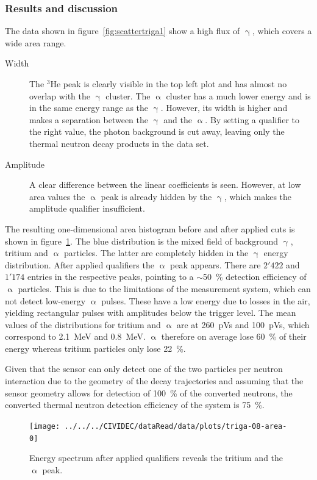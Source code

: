 \subsubsection{Results and discussion}
The data shown in figure~\ref{fig:scattertriga1} show a high flux of $\upgamma$, which covers a wide area range. 
\begin{description}
\item[Width] The $^3$He peak is clearly visible in the top left plot and has almost no overlap with the $\upgamma$ cluster. The $\upalpha$ cluster has a much lower energy and is in the same energy range as the $\upgamma$. However, its width is higher and makes a separation between the $\upgamma$ and the $\upalpha$. By setting a qualifier to the right value, the photon background is cut away, leaving only the thermal neutron decay products in the data set. 
\item[Amplitude] A clear difference between the linear coefficients is seen. However, at low area values the $\upalpha$ peak is already hidden by the $\upgamma$, which makes the amplitude qualifier insufficient.
\end{description}
The resulting one-dimensional area histogram before and after applied cuts is shown in figure~\ref{fig:areatriga0}. The blue distribution is the mixed field of background $\upgamma$, tritium and $\upalpha$ particles. The latter are completely hidden in the $\upgamma$ energy distribution. After applied qualifiers the $\upalpha$ peak appears. There are $2'422$ and $1'174$ entries in the respective peaks, pointing to a $\sim$50~\% detection efficiency of $\upalpha$ particles. This is due to the limitations of the measurement system, which can not detect low-energy $\upalpha$ pulses. These have a low energy due to losses in the air, yielding rectangular pulses with amplitudes below the trigger level. The mean values of the distributions for tritium and $\upalpha$ are at 260~pVs and 100~pVs, which correspond to 2.1~MeV and 0.8~MeV. $\upalpha$ therefore on average lose 60~\% of their energy whereas tritium particles only lose 22~\%.

Given that the sensor can only detect one of the two particles per neutron interaction due to the geometry of the decay trajectories and assuming that the sensor geometry allows for detection of 100~\% of the converted neutrons, the converted thermal neutron detection efficiency of the system is 75~\%.

\clearpage
\begin{figure}[!t]
\centering
\texttt{[image: ../../../CIVIDEC/dataRead/data/plots/triga-08-area-0]}
\caption{Energy spectrum after applied qualifiers reveals the tritium and the $\upalpha$ peak.}
\label{fig:areatriga0}
\end{figure}


